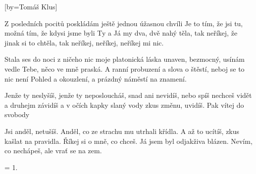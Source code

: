 [by={Tomáš Klus}]

\beginverse{}
Z posledních pocitů poskládám ještě jednou úžasnou chvíli
Je to tím, že jsi tu, možná tím, že kdysi jsme byli Ty a
Já my dva, dvě nahý těla, tak neříkej, že jinak si to chtěla,
tak neříkej, neříkej, neříkej mi nic.
\endverse{}

\beginverse{}
Stala ses do noci z ničeho nic moje platonická láska
unaven, bezmocný, usínám vedle Tebe, něco ve mně praská.
A ranní probuzení a slova o štěstí, neboj se to nic není
Pohled a okouzlení, a prázdný náměstí na znamení. 
\endverse{}

\beginchorus{}
Jenže ty neslyšíš, jenže ty neposloucháš,
snad ani nevidíš, nebo spíš nechceš vidět
a druhejm závidíš a v očích kapky slaný vody
zkus změnu, uvidíš. Pak vítej do svobody
\endchorus{}

\beginverse{}
Jsi anděl, netušíš. Anděl, co ze strachu mu utrhali křídla.
A až to ucítíš, zkus kašlat na pravidla.
Říkej si o mně, co chceš. Já jsem byl odjakživa blázen.
Nevím, co nechápeš, ale vrať se na zem. 
\endverse{}

\beginchorus{}
\phantom{}
\endchorus{}

\beginverse{}
= 1.
\endverse{}

\endsong{}
